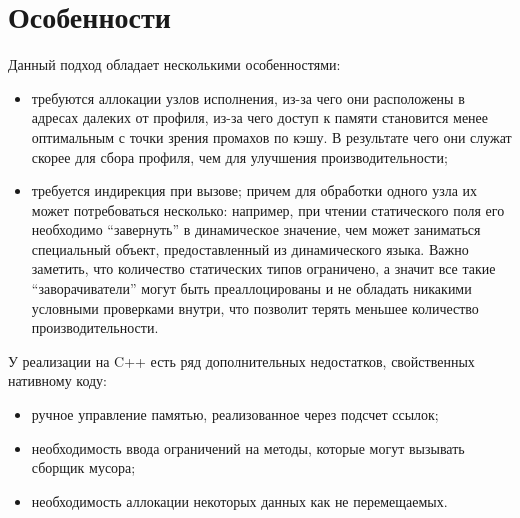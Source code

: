 \documentclass[times,specification,annotation]{itmo-student-thesis}
\begin{document}
\section{Особенности}
Данный подход обладает несколькими особенностями:
\begin{itemize}
	\item требуются аллокации узлов исполнения, из-за чего они расположены в адресах далеких от профиля, из-за чего доступ к памяти становится менее оптимальным с точки зрения промахов по кэшу. В результате чего они служат скорее для сбора профиля, чем для улучшения производительности;
	\item требуется индирекция при вызове; причем для обработки одного узла их может потребоваться несколько: например, при чтении статического поля его необходимо ``завернуть'' в динамическое значение, чем может заниматься специальный объект, предоставленный из динамического языка. Важно заметить, что количество статических типов ограничено, а значит все такие ``заворачиватели'' могут быть преаллоцированы и не обладать никакими условными проверками внутри, что позволит терять меньшее количество производительности.
\end{itemize}

У реализации на C++ есть ряд дополнительных недостатков, свойственных нативному коду:
\begin{itemize}
	\item ручное управление памятью, реализованное через подсчет ссылок;
	\item необходимость ввода ограничений на методы, которые могут вызывать сборщик мусора;
	\item необходимость аллокации некоторых данных как не перемещаемых.
\end{itemize}
\end{document}
